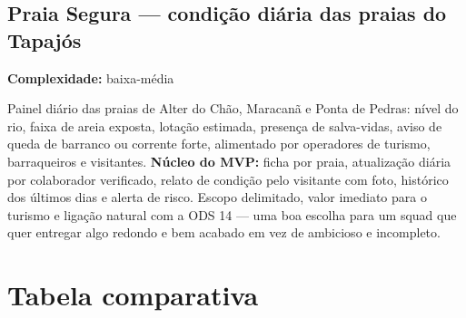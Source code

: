 \documentclass[11pt,a4paper]{article}
\newcommand{\complex}[1]{{\small\color{cinza}\textbf{Complexidade:} #1}}
\begin{document}
\subsection{Praia Segura --- condição diária das praias do Tapajós}
\complex{baixa-média}

Painel diário das praias de Alter do Chão, Maracanã e Ponta de Pedras: nível do rio, faixa de areia
exposta, lotação estimada, presença de salva-vidas, aviso de queda de barranco ou corrente forte,
alimentado por operadores de turismo, barraqueiros e visitantes. \textbf{Núcleo do MVP:} ficha por
praia, atualização diária por colaborador verificado, relato de condição pelo visitante com foto,
histórico dos últimos dias e alerta de risco. Escopo delimitado, valor imediato para o turismo e
ligação natural com a ODS 14 --- uma boa escolha para um squad que quer entregar algo redondo e bem
acabado em vez de ambicioso e incompleto.

\newpage

\section*{Tabela comparativa}
\end{document}
